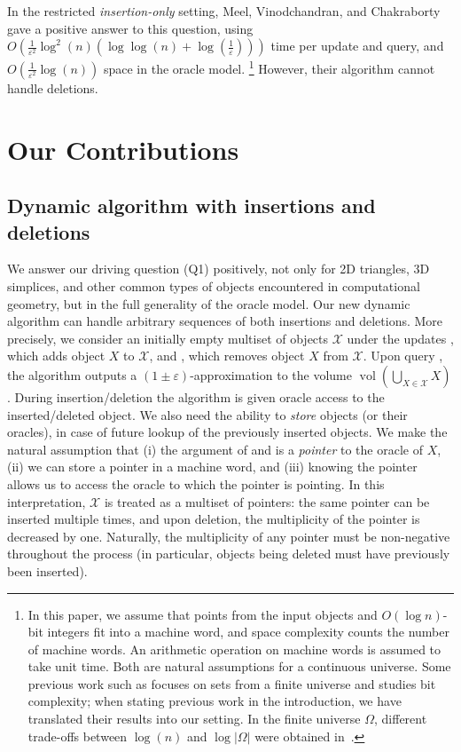 \documentclass[11pt]{article}
\def\vol{\operatorname{vol}}		%
\newcommand{\eps}{\varepsilon}
\newcommand{\class}[1]{\mathcal{#1}}
\begin{document}
%
In the restricted \emph{insertion-only} setting, Meel, Vinodchandran, and Chakraborty~\cite{MVC21} gave a positive answer to this question, using $O\left(\frac{1}{\eps^2} \log^2(n) (\log \log(n) + \log(\frac{1}{\eps})) \right)$ time per update and query, and $O\left( \frac{1}{\eps^2} \log(n) \right)$ space in the oracle model.%
\footnote{In this paper, we assume that points from the input objects and $O(\log n)$-bit integers fit into a machine word, and space complexity counts the number of machine words. An arithmetic operation on machine words is assumed to take unit time. Both are natural assumptions for a continuous universe. Some previous work such as \cite{MVC21} focuses on sets from a finite universe and studies bit complexity; when stating previous work in the introduction, we have translated their results into our setting. In the finite universe $\Omega$, different trade-offs between $\log(n)$ and $\log |\Omega|$ were obtained in~\cite{MCV22,NandiVGMP024}.}
However, their algorithm cannot handle deletions.
%
\section{Our Contributions}
%
\subsection{Dynamic algorithm with insertions and deletions}
We answer our driving question (Q1) positively, not only for 2D triangles, 3D simplices, and other common types of objects encountered in computational geometry, but in the full generality of the oracle model.  Our new dynamic algorithm can handle arbitrary sequences of both insertions and deletions.
%
More precisely, we consider an initially empty multiset of objects $\class{X}$ under the updates , which adds object $X$ to $\class{X}$, and , which removes object $X$ from $\class{X}$. Upon query \est{}, the algorithm outputs a $(1\pm\eps)$-approximation to the volume $\vol\left(\bigcup_{X \in \class{X}} X\right)$.
%
During insertion/deletion the algorithm is given oracle access to the inserted/deleted object. We also need the ability to \emph{store} objects (or their oracles), in case of future lookup of the previously inserted objects. We make the natural assumption that (i) the argument of  and  is a \emph{pointer} to the oracle of $X$, (ii) we can store a pointer in a machine word, and (iii) knowing the pointer allows us to access the oracle to which the pointer is pointing. In this interpretation, $\class{X}$ is treated as a multiset of pointers: the same pointer can be inserted multiple times, and upon deletion, the multiplicity of the pointer is decreased by one. Naturally, the multiplicity of any pointer must be non-negative throughout the process (in particular, objects being deleted must have previously been inserted).
%
\end{document}
